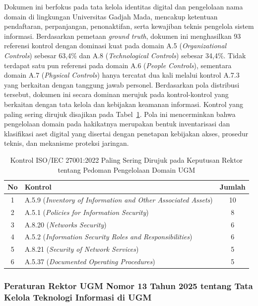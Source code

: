 Dokumen ini berfokus pada tata kelola identitas digital dan pengelolaan nama domain di lingkungan Universitas Gadjah Mada, mencakup ketentuan pendaftaran, perpanjangan, penonaktifan, serta kewajiban teknis pengelola sistem informasi. Berdasarkan pemetaan \textit{ground truth}, dokumen ini menghasilkan 93 referensi kontrol dengan dominasi kuat pada domain A.5 (\textit{Organizational Controls}) sebesar 63,4\% dan A.8 (\textit{Technological Controls}) sebesar 34,4\%. Tidak terdapat satu pun referensi pada domain A.6 (\textit{People Controls}), sementara domain A.7 (\textit{Physical Controls}) hanya tercatat dua kali melalui kontrol A.7.3 yang berkaitan dengan tanggung jawab personel. Berdasarkan pola distribusi tersebut, dokumen ini secara dominan merujuk pada kontrol-kontrol yang berkaitan dengan tata kelola dan kebijakan keamanan informasi. Kontrol yang paling sering dirujuk disajikan pada Tabel~\ref{tbl:top_ctrl_domain}. Pola ini mencerminkan bahwa pengelolaan domain pada hakikatnya merupakan bentuk inventarisasi dan klasifikasi aset digital yang disertai dengan penetapan kebijakan akses, prosedur teknis, dan mekanisme proteksi jaringan.

\begin{table}[H]
	\centering
	\caption{Kontrol ISO/IEC 27001:2022 Paling Sering Dirujuk pada Keputusan Rektor tentang Pedoman Pengelolaan Domain UGM}
	\label{tbl:top_ctrl_domain}
	\small
	\begin{tabular}{|c|>{\raggedright\arraybackslash}p{8.5cm}|c|}
		\hline
		\textbf{No} & \textbf{Kontrol} & \textbf{Jumlah} \\
		\hline
		1 & A.5.9 (\textit{Inventory of Information and Other Associated Assets}) & 10 \\
		\hline
		2 & A.5.1 (\textit{Policies for Information Security}) & 8 \\
		\hline
		3 & A.8.20 (\textit{Networks Security}) & 6 \\
		\hline
		4 & A.5.2 (\textit{Information Security Roles and Responsibilities}) & 6 \\
		\hline
		5 & A.8.21 (\textit{Security of Network Services}) & 5 \\
		\hline
		6 & A.5.37 (\textit{Documented Operating Procedures}) & 5 \\
		\hline
	\end{tabular}
\end{table}

\subsubsection{Peraturan Rektor UGM Nomor 13 Tahun 2025 tentang Tata Kelola Teknologi Informasi di UGM}

